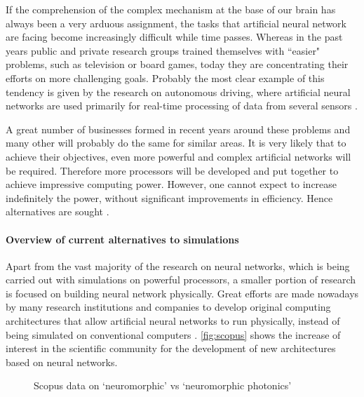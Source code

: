 If the comprehension of the complex mechanism at the base of our brain has always been a very arduous assignment, the tasks that artificial neural network are facing become increasingly difficult while time passes.
Whereas in the past years public and private research groups trained themselves with ``easier" problems, such as television or board games, today they are concentrating their efforts on more challenging goals.
Probably the most clear example of this tendency is given by the research on autonomous driving, where artificial neural networks are used primarily for real-time processing of data from several sensors \cite{roadDetection}.

A great number of businesses formed in recent years around these problems and many other will probably do the same for similar areas.
It is very likely that to achieve their objectives, even more powerful and complex artificial networks will be required.
Therefore more processors will be developed and put together to achieve impressive computing power.
However, one cannot expect to increase indefinitely the power, without significant improvements in efficiency.
Hence alternatives are sought \cite{soman2016recent}.

\paragraph{Overview of current alternatives to simulations\\}
Apart from the vast majority of the research on neural networks, which is being carried out with simulations on powerful processors, a smaller portion of research is focused on building neural network physically.
Great efforts are made nowadays by many research institutions and companies to develop original computing architectures that allow artificial neural networks to run physically, instead of being simulated on conventional computers \cite{soman2016recent}.
\autoref{fig:scopus} shows the increase of interest in the scientific community for the development of new architectures based on neural networks.

\begin{figure}[htbp]
	\centering
	
	\caption{Scopus data on `neuromorphic' vs `neuromorphic photonics'}
	\label{fig:scopus}
\end{figure}

